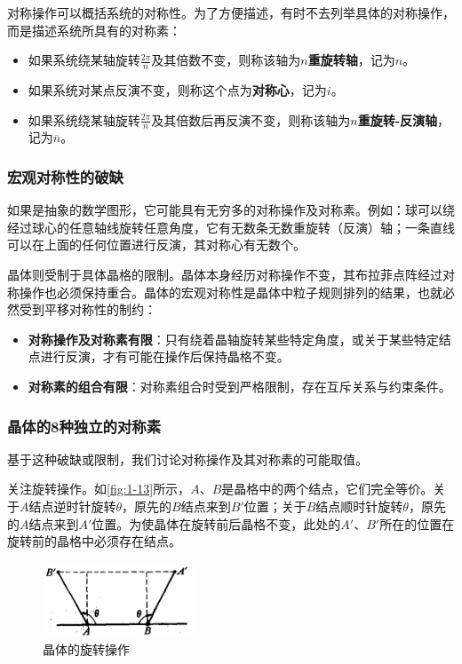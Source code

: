     对称操作可以概括系统的对称性。为了方便描述，有时不去列举具体的对称操作，而是描述系统所具有的对称素：
    \begin{itemize}[itemsep=0pt,parsep=0pt]
        \item 如果系统绕某轴旋转$\frac{2\pi}{n}$及其倍数不变，则称该轴为\textbf{$n$重旋转轴}，记为$n$。
        \item 如果系统对某点反演不变，则称这个点为\textbf{对称心}，记为$i$。
        \item 如果系统绕某轴旋转$\frac{2\pi}{n}$及其倍数后再反演不变，则称该轴为\textbf{$n$重旋转-反演轴}，记为$\overline{n}$。
    \end{itemize}

\subsubsection{宏观对称性的破缺}
    如果是抽象的数学图形，它可能具有无穷多的对称操作及对称素。例如：球可以绕经过球心的任意轴线旋转任意角度，它有无数条无数重旋转（反演）轴；一条直线可以在上面的任何位置进行反演，其对称心有无数个。

    晶体则受制于具体晶格的限制。晶体本身经历对称操作不变，其布拉菲点阵经过对称操作也必须保持重合。晶体的宏观对称性是晶体中粒子规则排列的结果，也就必然受到平移对称性的制约：
    \begin{itemize}[itemsep=0pt,parsep=0pt]
        \item \textbf{对称操作及对称素有限}：只有绕着晶轴旋转某些特定角度，或关于某些特定结点进行反演，才有可能在操作后保持晶格不变。
        \item \textbf{对称素的组合有限}：对称素组合时受到严格限制，存在互斥关系与约束条件。
    \end{itemize}

\subsubsection{晶体的8种独立的对称素}
    基于这种破缺或限制，我们讨论对称操作及其对称素的可能取值。

    关注旋转操作。如\autoref{fig:1-13}所示，$A$、$B$是晶格中的两个结点，它们完全等价。关于$A$结点逆时针旋转$\theta$，原先的$B$结点来到$B'$位置；关于$B$结点顺时针旋转$\theta$，原先的$A$结点来到$A'$位置。为使晶体在旋转前后晶格不变，此处的$A'$、$B'$所在的位置在旋转前的晶格中必须存在结点。

    \begin{figure}[!htbp]
        \centering    
        \includegraphics[height=6em, keepaspectratio=true]{pic/1-43}
        \caption{晶体的旋转操作}
        \label{fig:1-13}
    \end{figure}
    
